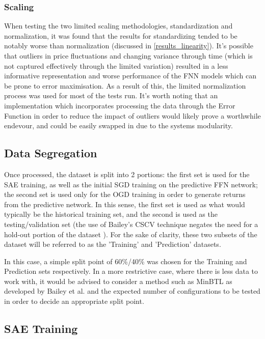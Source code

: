 \documentclass[a4paper,11pt,oneside]{article}
\theoremstyle{plain}
\theoremstyle{definition}
\begin{document}
\subsubsection {Scaling} When testing the two limited scaling methodologies, standardization and normalization, it was found that the results for standardizing tended to be notably worse than normalization (discussed in \ref{results_linearity}). It's possible that outliers in price fluctuations and changing variance through time (which is not captured effectively through the limited variation) resulted in a less informative representation and worse performance of the FNN models which can be prone to error maximisation. As a result of this, the limited normalization process was used for most of the tests run. It's worth noting that an implementation which incorporates processing the data through the Error Function in order to reduce the impact of outliers would likely prove a worthwhile endevour, and could be easily swapped in due to the systems modularity.\newline


\subsection{Data Segregation}\label{proc_dataseg}

Once processed, the dataset is split into 2 portions: the first set is used for the SAE training, as well as the initial SGD training on the predictive FFN network; the second set is used only for the OGD training in order to generate returns from the predictive network. In this sense, the first set is used as what would typically be the historical training set, and the second is used as the testing/validation set (the use of Bailey's CSCV technique negates the need for a hold-out portion of the dataset \cite{BailyPBO}). For the sake of clarity, these two subsets of the dataset will be referred to as the 'Training' and 'Prediction' datasets. \newline

In this case, a simple split point of 60\%/40\% was chosen for the Training and Prediction sets respectively. In a more restrictive case, where there is less data to work with, it would be advised to consider a method such as MinBTL as developed by Bailey et al. \cite{BaileyBTL} and the expected number of configurations to be tested in order to decide an appropriate split point.

\subsection{SAE Training}\label{proc_sae}
\end{document}
